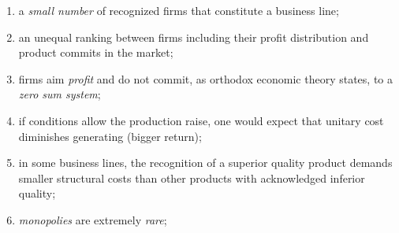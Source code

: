 \documentclass[a4paper, 12pt, openright, oneside, german, french, brazil, english, article]{abntex2}
\begin{document}
	\begin{enumerate}
		\item a \textit{small number} of recognized firms that constitute a business line;
		\item an unequal ranking between firms including their profit distribution and product commits in the market;
		\item firms aim \textit{profit} and do not commit, as orthodox economic theory states, to a \textit{zero sum system};
		\item if conditions allow the production raise, one would expect that unitary cost diminishes generating (bigger return);
		\item in some business lines, the recognition of a superior quality product demands smaller structural costs than other products with acknowledged inferior quality;
		\item \textit{monopolies} are extremely \textit{rare};
	\end{enumerate}
	
	
	
\end{document}
